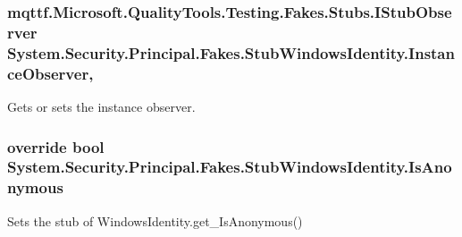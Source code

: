 \hypertarget{class_system_1_1_security_1_1_principal_1_1_fakes_1_1_stub_windows_identity_ab4c475b8720795232c823b39e0bc6dcf}{
\subsubsection[{Instance\-Observer}]{\setlength{\rightskip}{0pt plus 5cm}mqttf.\-Microsoft.\-Quality\-Tools.\-Testing.\-Fakes.\-Stubs.\-I\-Stub\-Observer System.\-Security.\-Principal.\-Fakes.\-Stub\-Windows\-Identity.\-Instance\-Observer\hspace{0.3cm}{\ttfamily [get]}, {\ttfamily [set]}}}\label{class_system_1_1_security_1_1_principal_1_1_fakes_1_1_stub_windows_identity_ab4c475b8720795232c823b39e0bc6dcf}


Gets or sets the instance observer.

\hypertarget{class_system_1_1_security_1_1_principal_1_1_fakes_1_1_stub_windows_identity_abb94545c48986aaad9039abb21e82159}{
\subsubsection[{Is\-Anonymous}]{\setlength{\rightskip}{0pt plus 5cm}override bool System.\-Security.\-Principal.\-Fakes.\-Stub\-Windows\-Identity.\-Is\-Anonymous\hspace{0.3cm}{\ttfamily [get]}}}\label{class_system_1_1_security_1_1_principal_1_1_fakes_1_1_stub_windows_identity_abb94545c48986aaad9039abb21e82159}


Sets the stub of Windows\-Identity.\-get\-\_\-\-Is\-Anonymous()

